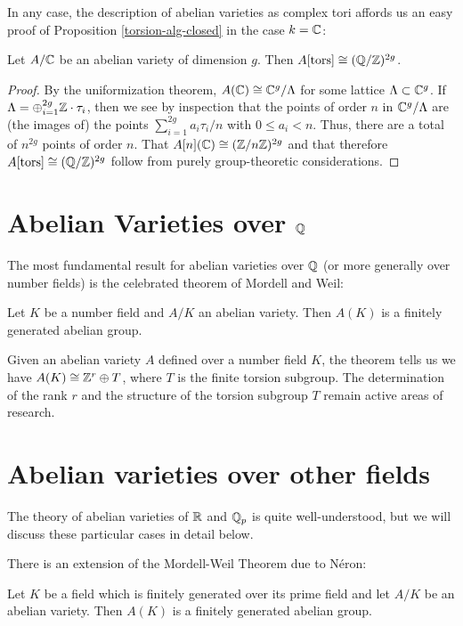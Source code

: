 In any case, the description of abelian varieties as complex tori affords us an easy proof of Proposition \ref{torsion-alg-closed} in the case $k=\mathbb{C}$:
\begin{proposition}
\label{torsion-C}
Let $A/\mathbb{C}$ be an abelian variety of dimension $g$. Then $A[\operatorname{tors}]\cong (\mathbb{Q}/\mathbb{Z})^{2g}$.
\end{proposition}
\begin{proof}
By the uniformization theorem, $A(\mathbb{C})\cong \mathbb{C}^g/\Lambda$ for some lattice $\Lambda\subset \mathbb{C}^g$. If $\Lambda = \oplus_{i=1}^{2g}\mathbb{Z}\cdot \tau_i$, then we see by inspection that the points of order $n$ in $\mathbb{C}^g/\Lambda$ are (the images of) the points $\sum_{i=1}^{2g}a_i\tau_i/n$ with $0\leq a_i <n$. Thus, there are a total of $n^{2g}$ points of order $n$. That $A[n](\mathbb{C})\cong (\mathbb{Z}/n\mathbb{Z})^{2g}$ and that therefore $A[\operatorname{tors}]\cong (\mathbb{Q}/\mathbb{Z})^{2g}$ follow from purely group-theoretic considerations.
\end{proof}

\section{Abelian Varieties over $\mathbb{Q}$}
The most fundamental result for abelian varieties over $\mathbb{Q}$ (or more generally over number fields) is the celebrated theorem of Mordell and Weil:
\begin{theorem}
\label{mordell-weil}
Let $K$ be a number field and $A/K$ an abelian variety. Then $A(K)$ is a finitely generated abelian group.
\end{theorem}

Given an abelian variety $A$ defined over a number field $K$, the theorem tells us we have $A(K)\cong \mathbb{Z}^r \oplus T$, where $T$ is the finite torsion subgroup. The determination of the rank $r$ and the structure of the torsion subgroup $T$ remain active areas of research.

\section{Abelian varieties over other fields}

The theory of abelian varieties of $\mathbb{R}$ and $\mathbb{Q}_p$ is quite well-understood, but we will discuss these particular cases in detail below. 

There is an extension of the Mordell-Weil Theorem due to N\'eron:

\begin{theorem}
\label{neron-mordell-weil}
Let $K$ be a field which is finitely generated over its prime field and let $A/K$ be an abelian variety. Then $A(K)$ is a finitely generated abelian group.
\end{theorem}

